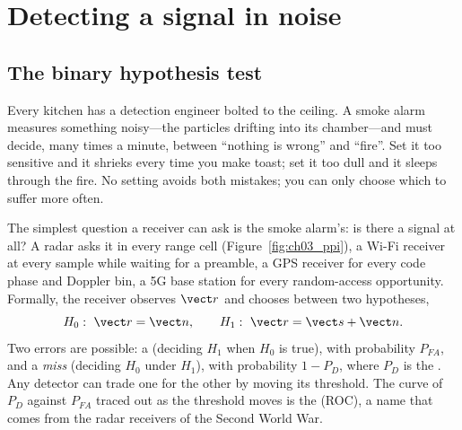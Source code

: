 \section{Detecting a signal in noise}
\label{sec:ch03:detection}

\subsection{The binary hypothesis test}

Every kitchen has a detection engineer bolted to the ceiling. A smoke alarm measures something noisy---the
particles drifting into its chamber---and must decide, many times a minute, between ``nothing is wrong'' and
``fire''. Set it too sensitive and it shrieks every time you make toast; set it too dull and it sleeps through
the fire. No setting avoids both mistakes; you can only choose which to suffer more often.


The simplest question a receiver can ask is the smoke alarm's: is there a signal at all? A radar asks it in
every range cell (Figure~\ref{fig:ch03_ppi}), a Wi-Fi receiver at every sample while waiting for a preamble,
a GPS receiver for every code phase and Doppler bin, a 5G base station for every random-access opportunity.
Formally, the receiver observes $\vect r$ and chooses between two hypotheses,
\begin{equation}
H_0:\ \vect r=\vect n,\qquad H_1:\ \vect r=\vect s+\vect n .
\end{equation}
Two errors are possible: a  (deciding $H_1$ when $H_0$ is true), with probability
$P_{FA}$, and a \emph{miss} (deciding $H_0$ under $H_1$), with probability $1-P_D$, where $P_D$ is the
. Any detector can trade one for the other by moving its threshold. The
curve of $P_D$ against $P_{FA}$ traced out as the threshold moves is the  (ROC), a name that comes from the radar receivers of the Second World War.

